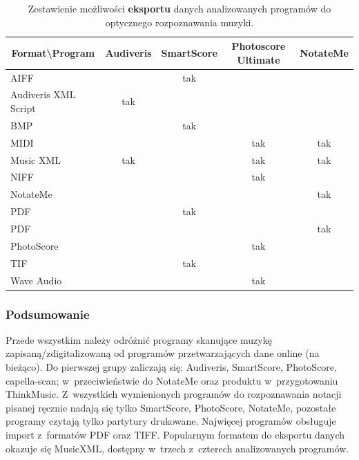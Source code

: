 \documentclass[polish,thesis,12pt]{dcsbook}
\begin{document}
\begin{center}
\begin{longtable}{|l|c|c|c|c|}
\caption{Zestawienie możliwości \textbf{eksportu} danych analizowanych programów do optycznego rozpoznawania muzyki.} \label{omr-eksport} \\
\hline
\multicolumn{1}{|c|}{\textbf{Format{\textbackslash}Program}} & Audiveris & SmartScore & Photoscore Ultimate & NotateMe \\ \hline
AIFF                                          &           & tak        &                     &          \\ \hline
Audiveris XML Script                          & tak       &            &                     &          \\ \hline
BMP                                           &           & tak        &                     &          \\ \hline
MIDI                                          &           &            & tak                 & tak      \\ \hline
Music XML                                     & tak       &            & tak                 & tak      \\ \hline
NIFF                                          &           &            & tak                 &          \\ \hline
NotateMe                                      &           &            &                     & tak      \\ \hline
PDF                                           &           & tak        &                     &          \\ \hline
PDF                                           &           &            &                     & tak      \\ \hline
PhotoScore                                    &           &            & tak                 &          \\ \hline
TIF                                           &           & tak        &                     &          \\ \hline
Wave Audio                                    &           &            & tak                 &          \\ \hline
\end{longtable}
\end{center}

\subsubsection{Podsumowanie}
Przede wszystkim należy odróżnić programy skanujące muzykę zapisaną/zdigitalizowaną od programów przetwarzających dane online (na bieżąco). Do pierwszej grupy zaliczają się: Audiveris, SmartScore, PhotoScore, capella-scan; w~przeciwieństwie do NotateMe oraz produktu w~przygotowaniu ThinkMusic. Z~wszystkich wymienionych programów do rozpoznawania notacji pisanej ręcznie nadają się tylko SmartScore, PhotoScore, NotateMe, pozostałe programy czytają tylko partytury drukowane. Najwięcej programów obsługuje import z~formatów PDF oraz TIFF. Popularnym formatem do eksportu danych okazuje się MusicXML, dostępny w~trzech z~czterech analizowanych programów. 
\end{document}
